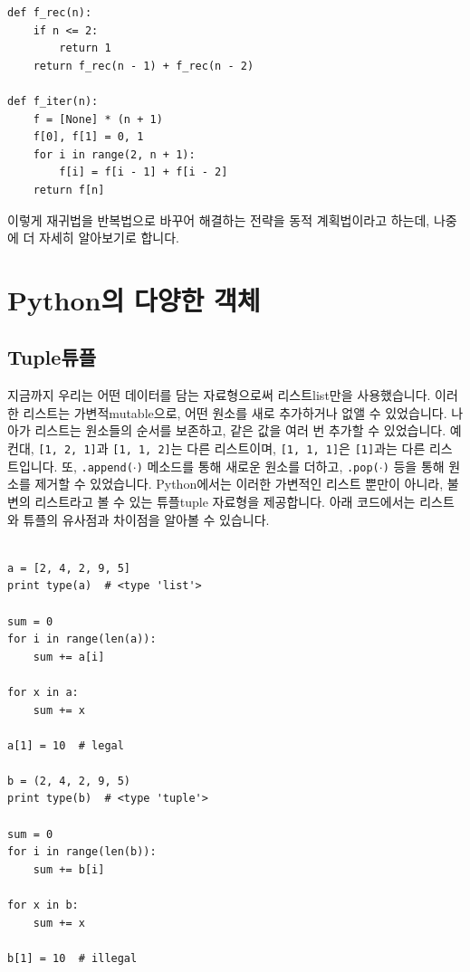 \documentclass[../main.tex]{subfiles}
\begin{document}
\begin{verbatim}
def f_rec(n):
    if n <= 2:
        return 1
    return f_rec(n - 1) + f_rec(n - 2)

def f_iter(n):
    f = [None] * (n + 1)
    f[0], f[1] = 0, 1
    for i in range(2, n + 1):
        f[i] = f[i - 1] + f[i - 2]
    return f[n]
\end{verbatim}

이렇게 재귀법을 반복법으로 바꾸어 해결하는 전략을 동적 계획법이라고 하는데, 나중에 더 자세히 알아보기로 합니다.

\section{Python의 다양한 객체}
\subsection{Tuple튜플}
지금까지 우리는 어떤 데이터를 담는 자료형으로써 리스트list만을 사용했습니다.
이러한 리스트는 가변적mutable으로, 어떤 원소를 새로 추가하거나 없앨 수 있었습니다.
나아가 리스트는 원소들의 순서를 보존하고, 같은 값을 여러 번 추가할 수 있었습니다.
예컨대, \texttt{[1, 2, 1]}과 \texttt{[1, 1, 2]}는 다른 리스트이며, \texttt{[1, 1, 1]}은 \texttt{[1]}과는 다른 리스트입니다.
또, \texttt{.append($\cdot$)} 메소드를 통해 새로운 원소를 더하고, \texttt{.pop($\cdot$)} 등을 통해 원소를 제거할 수 있었습니다.
Python에서는 이러한 가변적인 리스트 뿐만이 아니라, 불변의 리스트라고 볼 수 있는 튜플tuple 자료형을 제공합니다.
아래 코드에서는 리스트와 튜플의 유사점과 차이점을 알아볼 수 있습니다.
\begin{verbatim}

a = [2, 4, 2, 9, 5]
print type(a)  # <type 'list'>

sum = 0
for i in range(len(a)):
    sum += a[i]

for x in a:
    sum += x

a[1] = 10  # legal

b = (2, 4, 2, 9, 5)
print type(b)  # <type 'tuple'>

sum = 0
for i in range(len(b)):
    sum += b[i]

for x in b:
    sum += x

b[1] = 10  # illegal
\end{verbatim}
\end{document}
